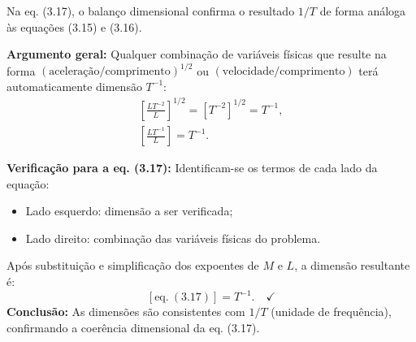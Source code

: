 Na eq. (3.17), o balanço dimensional confirma o resultado $1/T$ de forma análoga às equações (3.15) e (3.16).

\textbf{Argumento geral:} Qualquer combinação de variáveis físicas que resulte na forma $(\text{aceleração}/\text{comprimento})^{1/2}$ ou $(\text{velocidade}/\text{comprimento})$ terá automaticamente dimensão $T^{-1}$:
\begin{gather*}
\left[\frac{LT^{-2}}{L}\right]^{1/2} = \left[T^{-2}\right]^{1/2} = T^{-1}, \\[4pt]
\left[\frac{LT^{-1}}{L}\right] = T^{-1}.
\end{gather*}

\textbf{Verificação para a eq. (3.17):}
Identificam-se os termos de cada lado da equação:
\begin{itemize}
\item Lado esquerdo: dimensão a ser verificada;
\item Lado direito: combinação das variáveis físicas do problema.
\end{itemize}
Após substituição e simplificação dos expoentes de $M$ e $L$, a dimensão resultante é:
\[
[\text{eq.}\ (3.17)] = T^{-1}.\quad\checkmark
\]
\textbf{Conclusão:} As dimensões são consistentes com $1/T$ (unidade de frequência), confirmando a coerência dimensional da eq. (3.17).

